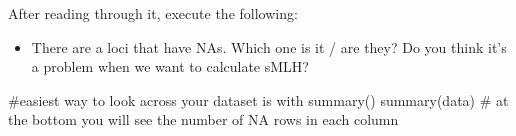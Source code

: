 \documentclass[
  letterpaper,
  DIV=11,
  numbers=noendperiod]{scrreprt}
\newenvironment{Shaded}{}{}
\newcommand{\CommentTok}[1]{\textcolor[rgb]{0.42,0.45,0.49}{#1}}
\newcommand{\FunctionTok}[1]{\textcolor[rgb]{0.44,0.26,0.76}{#1}}
\newcommand{\NormalTok}[1]{\textcolor[rgb]{0.14,0.16,0.18}{#1}}
\providecommand{\tightlist}{%
  \setlength{\itemsep}{0pt}\setlength{\parskip}{0pt}}\usepackage{longtable,booktabs,array}
\begin{document}
After reading through it, execute the following:

\begin{itemize}
\tightlist
\item
  There are a loci that have NAs. Which one is it / are they? Do you
  think it's a problem when we want to calculate sMLH?
\end{itemize}

\begin{tcolorbox}[enhanced jigsaw, arc=.35mm, left=2mm, titlerule=0mm, rightrule=.15mm, colframe=quarto-callout-tip-color-frame, coltitle=black, colback=white, opacityback=0, bottomtitle=1mm, bottomrule=.15mm, colbacktitle=quarto-callout-tip-color!10!white, breakable, title=\textcolor{quarto-callout-tip-color}{\faLightbulb}\hspace{0.5em}{Code and answer}, toptitle=1mm, toprule=.15mm, opacitybacktitle=0.6, leftrule=.75mm]

\begin{Shaded}
\begin{Highlighting}[]
\CommentTok{\#easiest way to look across your dataset is with summary()}
\FunctionTok{summary}\NormalTok{(data) }\CommentTok{\# at the bottom you will see the number of NA rows in each column}
\end{Highlighting}
\end{Shaded}


\end{tcolorbox}
\end{document}
